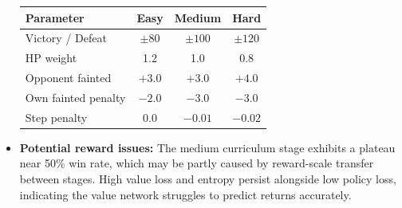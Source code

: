 \documentclass[11pt, a4paper]{article}
\begin{document}
\begin{itemize}
        \begin{center}
        \small
        \begin{tabularx}{\textwidth}{l c c c}
            \toprule
            \textbf{Parameter} & \textbf{Easy} & \textbf{Medium} & \textbf{Hard} \\
            \midrule
            Victory / Defeat       & $\pm80$  & $\pm100$ & $\pm120$ \\
            HP weight              & 1.2      & 1.0      & 0.8      \\
            Opponent fainted       & $+3.0$   & $+3.0$   & $+4.0$   \\
            Own fainted penalty    & $-2.0$   & $-3.0$   & $-3.0$   \\
            Step penalty           & $0.0$    & $-0.01$  & $-0.02$  \\
            \bottomrule
        \end{tabularx}
        \end{center}

    \item \textbf{Potential reward issues:}
        The medium curriculum stage exhibits a plateau near 50\% win rate, which may be partly caused by reward-scale transfer between stages. High value loss and entropy persist alongside low policy loss, indicating the value network struggles to predict returns accurately.
\end{itemize}

\end{document}
